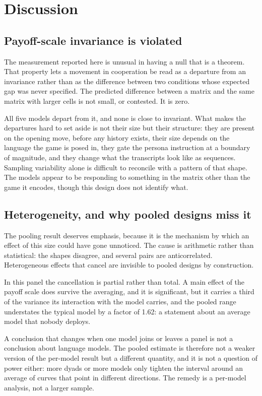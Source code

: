\documentclass[11pt,a4paper]{article}
\begin{document}
\section{Discussion}
\label{sec:discussion}

\subsection{Payoff-scale invariance is violated}

The measurement reported here is unusual in having a null that is a theorem.
That property lets a movement in cooperation be read as a departure from an
invariance rather than as the difference between two conditions whose expected
gap was never specified. The predicted difference between a matrix and the same
matrix with larger cells is not small, or contested. It is zero.

All five models depart from it, and none is close to invariant. What makes the
departures hard to set aside is not their size but their structure: they are
present on the opening move, before any history exists, their size depends on
the language the game is posed in, they gate the persona instruction at a
boundary of magnitude, and they change what the transcripts look like as
sequences. Sampling variability alone is difficult to reconcile with a pattern
of that shape. The models appear to be responding to something in the matrix
other than the game it encodes, though this design does not identify what.

\subsection{Heterogeneity, and why pooled designs miss it}

The pooling result deserves emphasis, because it is the mechanism by which an
effect of this size could have gone unnoticed. The cause is arithmetic rather
than statistical: the shapes disagree, and several pairs are anticorrelated.
Heterogeneous effects that cancel are invisible to pooled designs by
construction.

In this panel the cancellation is partial rather than total. A main effect of
the payoff scale does survive the averaging, and it is significant, but it
carries a third of the variance its interaction with the model carries, and the
pooled range understates the typical model by a factor of 1.62: a statement
about an average model that nobody deploys.

A conclusion that changes when one model joins or leaves a panel is not a
conclusion about language models. The pooled estimate is therefore not a weaker
version of the per-model result but a different quantity, and it is not a
question of power either: more dyads or more models only tighten the interval
around an average of curves that point in different directions. The remedy is a
per-model analysis, not a larger sample.
\end{document}
